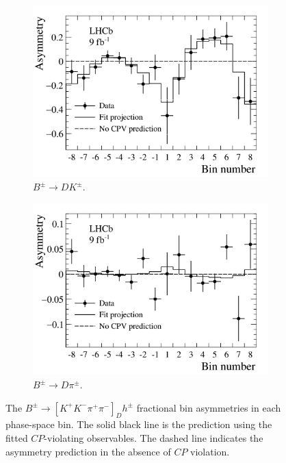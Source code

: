 \documentclass[12pt, a4paper, notitlepage, onecolumn]{article}
\begin{document}
\begin{figure}[tb]
    \centering
    \begin{subfigure}{0.5\textwidth}
        \includegraphics[width=1\textwidth]{Plots/BinAsymmetries_dk.png}
        \caption{$B^\pm\to DK^\pm$.}
        \label{figure:Bin_asymmetries_DK}
    \end{subfigure}%
    \begin{subfigure}{0.5\textwidth}
        \includegraphics[width=1\textwidth]{Plots/BinAsymmetries_dpi.png}
        \caption{$B^\pm\to D\pi^\pm$.}
        \label{figure:Bin_asymmetries_Dpi}
    \end{subfigure}
    \caption{The $B^\pm\to[K^+K^-\pi^+\pi^-]_D h^\pm$ fractional bin asymmetries in each phase-space bin. The solid black line is the prediction using the fitted $C\!P$-violating observables. The dashed line indicates the asymmetry prediction in the absence of $C\!P$ violation.}
    \label{figure:Bin_asymmetries}
\end{figure}
\end{document}

